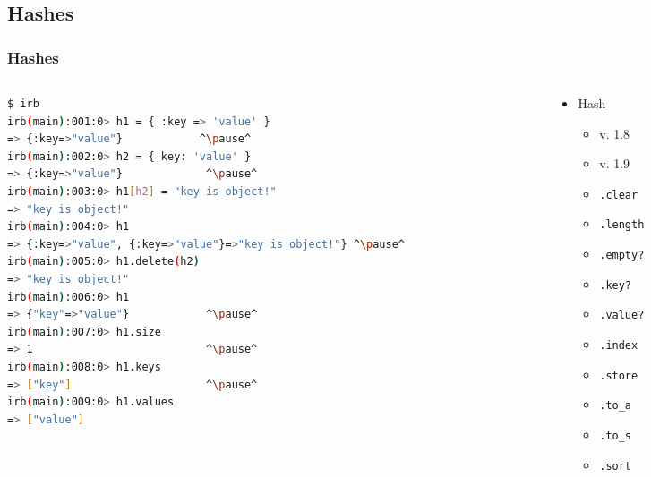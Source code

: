 \subsection{Hashes}
\begin{frame}[fragile]\frametitle{Hashes}

\begin{columns}[c] 

\begin{column}{8cm}
\begin{lstlisting}[language=bash, escapechar={^}]
$ irb
irb(main):001:0> h1 = { :key => 'value' }
=> {:key=>"value"}            ^\pause^
irb(main):002:0> h2 = { key: 'value' }
=> {:key=>"value"}             ^\pause^
irb(main):003:0> h1[h2] = "key is object!"
=> "key is object!"         
irb(main):004:0> h1
=> {:key=>"value", {:key=>"value"}=>"key is object!"} ^\pause^
irb(main):005:0> h1.delete(h2)
=> "key is object!"
irb(main):006:0> h1
=> {"key"=>"value"}            ^\pause^
irb(main):007:0> h1.size
=> 1                           ^\pause^
irb(main):008:0> h1.keys
=> ["key"]                     ^\pause^
irb(main):009:0> h1.values
=> ["value"]
\end{lstlisting}
\end{column}

\pause

\begin{column}{3.5cm}
\begin{itemize}

\item Hash
\begin{itemize}
\item v. 1.8
\item v. 1.9
\item \texttt{.clear}
\item \texttt{.length}
\item \texttt{.empty?}
\item \texttt{.key?}
\item \texttt{.value?}
\item \texttt{.index}
\item \texttt{.store}
\item \texttt{.to\_a}
\item \texttt{.to\_s}
\item \texttt{.sort}
\end{itemize}

\end{itemize}
\end{column}

\end{columns}

\end{frame}







